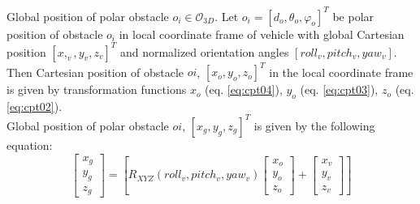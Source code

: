 \begin{definition}{Global position of polar obstacle $o_i\in\mathscr{O}_{3D}$.}\label{def:globalObstaclePosition3D}
    Let $o_i = [d_o, \theta_o, \varphi_o]^T$ be polar position of obstacle $o_i$ in local coordinate frame of vehicle with global Cartesian position $[x,_v,y_v,z_v]^T$ and normalized orientation angles $[roll_v,pitch_v,yaw_v]$.\\
    
    Then Cartesian position of obstacle $oi$, $[x_o,y_o,z_o]^T$  in the local coordinate frame is given by transformation functions $x_o$ (eq. \ref{eq:cpt04}), $y_o$ (eq. \ref{eq:cpt03}), $z_o$ (eq. \ref{eq:cpt02}).\\ 
    
    Global  position of polar obstacle $oi$, $[x_g,y_g,z_g]^T$ is given by the following equation:
    \begin{equation}
        \begin{bmatrix}
            x_g\\y_g\\z_g
        \end{bmatrix}
        =
        \left [
            R_{XYZ}(roll_v,pitch_v,yaw_v)
            \begin{bmatrix}
                x_o\\y_o\\z_o
            \end{bmatrix}
            +
            \begin{bmatrix}
                x_v\\y_v\\z_v
            \end{bmatrix}
        \right ]
    \end{equation}    
\end{definition}

